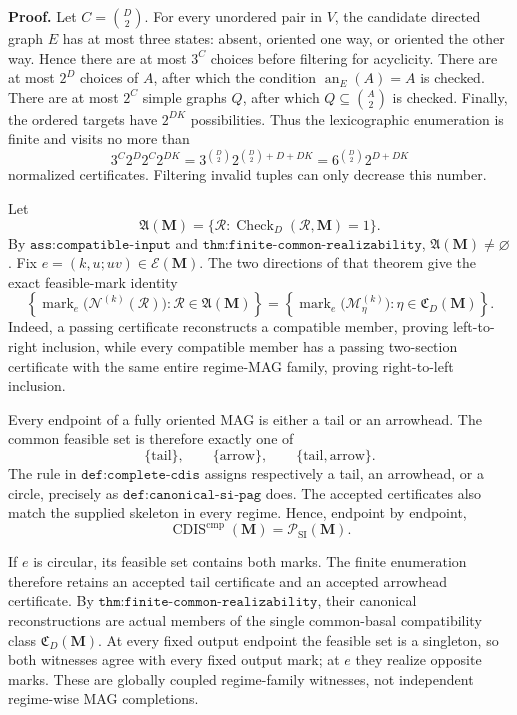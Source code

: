 \textbf{Proof.}
Let \(C=\binom D2\).  For every unordered pair in \(V\), the candidate directed graph \(E\) has at most three states: absent, oriented one way, or oriented the other way.  Hence there are at most \(3^C\) choices before filtering for acyclicity.  There are at most \(2^D\) choices of \(A\), after which the condition \(\operatorname{an}_E(A)=A\) is checked.  There are at most \(2^C\) simple graphs \(Q\), after which \(Q\subseteq\binom A2\) is checked.  Finally, the ordered targets have \(2^{DK}\) possibilities.  Thus the lexicographic enumeration is finite and visits no more than
\[
3^C2^D2^C2^{DK}
=3^{\binom D2}2^{\binom D2+D+DK}
=6^{\binom D2}2^{D+DK}
\]
normalized certificates.  Filtering invalid tuples can only decrease this number.

Let
\[
\mathfrak A(\mathbf M)
=\{\mathcal R:\operatorname{Check}_{D}(\mathcal R,\mathbf M)=1\}.
\]
By \(\texttt{ass:compatible-input}\) and \(\texttt{thm:finite-common-realizability}\), \(\mathfrak A(\mathbf M)\ne\varnothing\).  Fix \(e=(k,u;uv)\in\mathcal E(\mathbf M)\).  The two directions of that theorem give the exact feasible-mark identity
\[
\left\{
\operatorname{mark}_e\bigl(\mathcal N^{(k)}(\mathcal R)\bigr):
\mathcal R\in\mathfrak A(\mathbf M)
\right\}
=
\left\{
\operatorname{mark}_e\bigl(\mathcal M_\eta^{(k)}\bigr):
\eta\in\mathfrak C_D(\mathbf M)
\right\}.
\]
Indeed, a passing certificate reconstructs a compatible member, proving left-to-right inclusion, while every compatible member has a passing two-section certificate with the same entire regime-MAG family, proving right-to-left inclusion.

Every endpoint of a fully oriented MAG is either a tail or an arrowhead.  The common feasible set is therefore exactly one of
\[
\{\mathrm{tail}\},\qquad
\{\mathrm{arrow}\},\qquad
\{\mathrm{tail},\mathrm{arrow}\}.
\]
The rule in \(\texttt{def:complete-cdis}\) assigns respectively a tail, an arrowhead, or a circle, precisely as \(\texttt{def:canonical-si-pag}\) does.  The accepted certificates also match the supplied skeleton in every regime.  Hence, endpoint by endpoint,
\[
\operatorname{CDIS}^{\mathrm{cmp}}(\mathbf M)
=\mathcal P_{\mathrm{SI}}(\mathbf M).
\]

If \(e\) is circular, its feasible set contains both marks.  The finite enumeration therefore retains an accepted tail certificate and an accepted arrowhead certificate.  By \(\texttt{thm:finite-common-realizability}\), their canonical reconstructions are actual members of the single common-basal compatibility class \(\mathfrak C_D(\mathbf M)\).  At every fixed output endpoint the feasible set is a singleton, so both witnesses agree with every fixed output mark; at \(e\) they realize opposite marks.  These are globally coupled regime-family witnesses, not independent regime-wise MAG completions.

